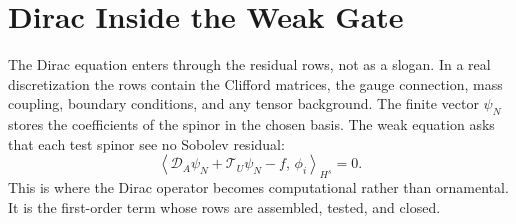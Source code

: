 \section{Dirac Inside the Weak Gate}

The Dirac equation enters through the residual rows, not as a slogan. In a real discretization the rows contain
the Clifford matrices, the gauge connection, mass coupling, boundary conditions, and any tensor background. The
finite vector \(\psi_N\) stores the coefficients of the spinor in the chosen basis. The weak equation asks that
each test spinor see no Sobolev residual:
\[
  \left\langle
    \mathcal D_A\psi_N + \mathcal T_U\psi_N - f,\,
    \phi_i
  \right\rangle_{H^s}
  = 0 .
\]
This is where the Dirac operator becomes computational rather than ornamental. It is the first-order term whose
rows are assembled, tested, and closed.
